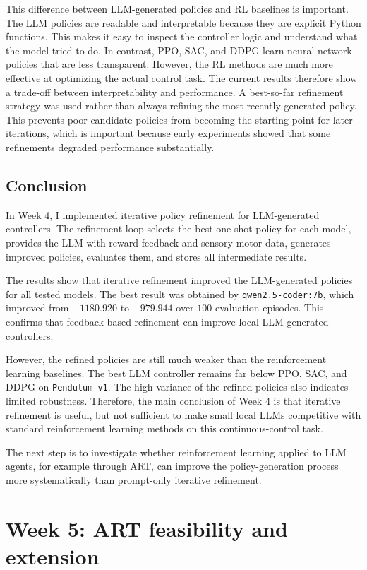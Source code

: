 \documentclass[11pt,a4paper]{article}
\begin{document}
This difference between LLM-generated policies and RL baselines is important. The LLM policies are readable and interpretable because they are explicit Python functions. This makes it easy to inspect the controller logic and understand what the model tried to do. In contrast, PPO, SAC, and DDPG learn neural network policies that are less transparent. However, the RL methods are much more effective at optimizing the actual control task. The current results therefore show a trade-off between interpretability and performance.
A best-so-far refinement strategy was used rather than always refining the most recently generated policy. This prevents poor candidate policies from becoming the starting point for later iterations, which is important because early experiments showed that some refinements degraded performance substantially.
\subsection{Conclusion}

In Week 4, I implemented iterative policy refinement for LLM-generated controllers. The refinement loop selects the best one-shot policy for each model, provides the LLM with reward feedback and sensory-motor data, generates improved policies, evaluates them, and stores all intermediate results.

The results show that iterative refinement improved the LLM-generated policies for all tested models. The best result was obtained by \texttt{qwen2.5-coder:7b}, which improved from $-1180.920$ to $-979.944$ over $100$ evaluation episodes. This confirms that feedback-based refinement can improve local LLM-generated controllers.

However, the refined policies are still much weaker than the reinforcement learning baselines. The best LLM controller remains far below PPO, SAC, and DDPG on \texttt{Pendulum-v1}. The high variance of the refined policies also indicates limited robustness. Therefore, the main conclusion of Week 4 is that iterative refinement is useful, but not sufficient to make small local LLMs competitive with standard reinforcement learning methods on this continuous-control task.

The next step is to investigate whether reinforcement learning applied to LLM agents, for example through ART, can improve the policy-generation process more systematically than prompt-only iterative refinement.

\section{Week 5: ART feasibility and extension}
\end{document}
